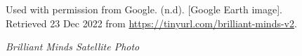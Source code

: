 \begin{figure}[hbtp]
\caption[Brilliant Minds Satellite Photo]{\textit{Brilliant Minds Satellite Photo}}%
\label{fig:brilliant-minds-sat-photo}
{Used with permission from Google. (n.d). [Google Earth image]. Retrieved 23 Dec 2022 from \url{https://tinyurl.com/brilliant-minds-v2}.}
\end{figure}

